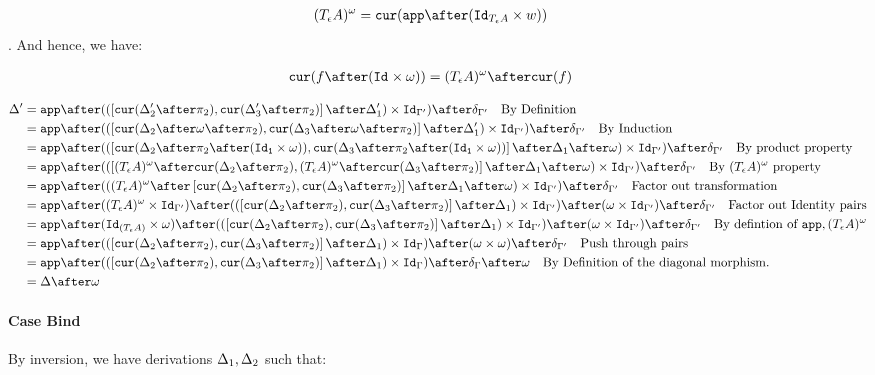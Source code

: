 \documentclass{report}
\begin{document}
    \begin{align}
        (\tea)^{\w} & = \cur{\app\after(\Id{\tea}\times w)}
    \end{align}.
    And hence, we have:

    \begin{align}
        \cur{f\after(\Id{}\times \w)} & = (\tea)^{\w} \after\cur{f}
    \end{align}

    \begin{align}
        \D' & =\app\after((\fld{\cur{\D_2'\after\pp}}{\cur{\D_3'\after\pp}}\after\D_1')\times \Id{\G'})\after\diag{\G'}\qt{By Definition}\\
        & =\app\after((\fld{\cur{\D_2\after\w\after\pp}}{\cur{\D_3\after\w\after\pp}}\after\D_1')\times \Id{\G'})\after\diag{\G'}\qt{By Induction}\\
        & = \app\after((\fld{\cur{\D_2\after\pp\after(\Id{\1}\times \w)}}{\cur{\D_3\after\pp\after(\Id{\1}\times \w)}}\after\D_1\after\w)\times \Id{\G'})\after\diag{\G'}\qt{By product property}\\
        & = \app\after((\fld{(\tea)^{\w}\after\cur{\D_2\after\pp}}{(\tea)^{\w}\after\cur{\D_3\after\pp}}\after\D_1\after\w)\times \Id{\G'})\after\diag{\G'}\qt{By $(\tea)^{\w}$ property}\\
        & = \app\after(((\tea)^{\w}\after\fld{\cur{\D_2\after\pp}}{\cur{\D_3\after\pp}}\after\D_1\after\w)\times \Id{\G'})\after\diag{\G'}\qt{Factor out transformation}\\
        & = \app\after((\tea)^{\w}\times\Id{\G'})\after((\fld{\cur{\D_2\after\pp}}{\cur{\D_3\after\pp}}\after\D_1)\times \Id{\G'})\after(\w \times \Id{\G'})\after\diag{\G'}\qt{Factor out Identity pairs}\\
        & = \app\after(\Id{(\tea)}\times\w)\after((\fld{\cur{\D_2\after\pp}}{\cur{\D_3\after\pp}}\after\D_1) \times \Id{\G'})\after(\w \times \Id{\G'})\after\diag{\G'}\qt{By defintion of $\app, (\tea)^{\w}$}\\
        & = \app\after((\fld{\cur{\D_2\after\pp}}{\cur{\D_3\after\pp}}\after\D_1)\times \idg)\after(\w \times \w)\after\diag{\G'}\qt{Push through pairs}\\
        & = \app\after((\fld{\cur{\D_2\after\pp}}{\cur{\D_3\after\pp}}\after\D_1)\times \idg)\after\diag{\G}\after\w\qt{By Definition of the diagonal morphism.}\\
        & = \D\after\w
    \end{align}


    \paragraph{Case Bind}
    By inversion, we have derivations $\Delta_1, \Delta_2$ such that:
\end{document}
